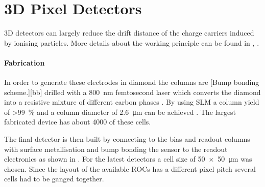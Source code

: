\section{3D Pixel Detectors}
3D detectors can largely reduce the drift distance of the charge carriers induced by ionising particles. More details about the working principle can be found in \cite{3D}, \cite{parker}.\par
\paragraph{Fabrication}
In order to generate these electrodes in diamond the columns are 
[Bump bonding scheme.][bb]
drilled with a \SI{800}{\nano\meter} femtosecond laser which converts the diamond into a resistive mixture of different carbon phases \cite{3dfab}. By using \ac{SLM} a column yield of \SI{>99}{\%} and a column diameter of \SI{2.6}{\micro\meter} can be achieved \cite{slm}. The largest fabricated device has about 4000 of these cells. \par
The final detector is then built by connecting to the bias and readout columns with surface metallisation and bump bonding the sensor to the readout electronics as shown in . For the latest detectors a cell size of \SI{50x50}{\micro\meter} was chosen. Since the layout of the available \acp{ROC} has a different pixel pitch several cells had to be ganged together.\par
